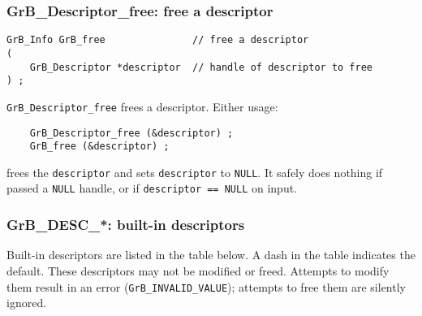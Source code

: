 \documentclass[12pt]{article}
\begin{document}
\subsubsection{{\sf GrB\_Descriptor\_free:} free a descriptor}
\label{descriptor_free}

\begin{mdframed}[userdefinedwidth=6in]
{\footnotesize
\begin{verbatim}
GrB_Info GrB_free               // free a descriptor
(
    GrB_Descriptor *descriptor  // handle of descriptor to free
) ;
\end{verbatim} } \end{mdframed}

\verb'GrB_Descriptor_free' frees a descriptor.
Either usage:

    {\small
    \begin{verbatim}
    GrB_Descriptor_free (&descriptor) ;
    GrB_free (&descriptor) ; \end{verbatim}}

\noindent
frees the \verb'descriptor' and sets \verb'descriptor' to \verb'NULL'.  It
safely does nothing if passed a \verb'NULL' handle, or if
\verb'descriptor == NULL' on input.

\newpage
\subsubsection{{\sf GrB\_DESC\_*:}  built-in descriptors}
\label{descriptor_predefined}

Built-in descriptors are listed in the table below.  A dash in the table
indicates the default.  These descriptors may not be modified or freed.
Attempts to modify them result in an error (\verb'GrB_INVALID_VALUE'); attempts
to free them are silently ignored. 

\end{document}
